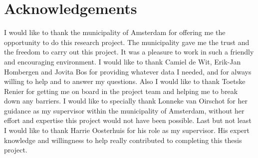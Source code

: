 \documentclass[10pt, sigconf, format=acmsmall, screen=true, review=false]{acmart}
\begin{document}
\section*{Acknowledgements}
I would like to thank the municipality of Amsterdam for offering me the opportunity to do this research project. 
The municipality gave me the trust and the freedom to carry out this project.
It was a pleasure to work in such a friendly and encouraging environment.
I would like to thank Camiel de Wit, Erik-Jan Hombergen and Jovita Bos for providing whatever data I needed, and for always willing to help and to answer my questions. 
Also I would like to thank Toetske Renier for getting me on board in the project team and helping me to break down any barriers. 
I would like to specially thank Lonneke van Oirschot for her guidance as my supervisor within the municipality of Amsterdam, without her effort and expertise this project would not have been possible. 
Last but not least I would like to thank Harrie Oosterhuis for his role as my supervisor. 
His expert knowledge and willingness to help really contributed to completing this thesis project.




\pagebreak
\onecolumn
\appendix



 
\end{document}
